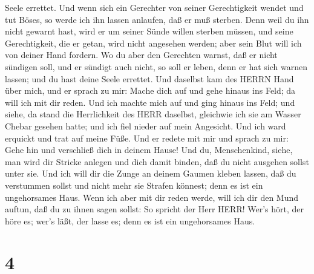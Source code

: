 Seele errettet.  Und wenn sich ein Gerechter von seiner
Gerechtigkeit wendet und tut Böses, so werde ich ihn lassen anlaufen,
daß er muß sterben. Denn weil du ihn nicht gewarnt hast, wird er um
seiner Sünde willen sterben müssen, und seine Gerechtigkeit, die er
getan, wird nicht angesehen werden; aber sein Blut will ich von deiner
Hand fordern.  Wo du aber den Gerechten warnst, daß er
nicht sündigen soll, und er sündigt auch nicht, so soll er leben, denn
er hat sich warnen lassen; und du hast deine Seele errettet.
 Und daselbst kam des HERRN Hand über mich, und er sprach
zu mir: Mache dich auf und gehe hinaus ins Feld; da will ich mit dir
reden.  Und ich machte mich auf und ging hinaus ins Feld;
und siehe, da stand die Herrlichkeit des HERR daselbst, gleichwie ich
sie am Wasser Chebar gesehen hatte; und ich fiel nieder auf mein
Angesicht.  Und ich ward erquickt und trat auf meine Füße.
Und er redete mit mir und sprach zu mir: Gehe hin und verschließ dich in
deinem Hause!  Und du, Menschenkind, siehe, man wird dir
Stricke anlegen und dich damit binden, daß du nicht ausgehen sollst
unter sie.  Und ich will dir die Zunge an deinem Gaumen
kleben lassen, daß du verstummen sollst und nicht mehr sie Strafen
könnest; denn es ist ein ungehorsames Haus.  Wenn ich aber
mit dir reden werde, will ich dir den Mund auftun, daß du zu ihnen sagen
sollst: So spricht der Herr HERR! Wer's hört, der höre es; wer's läßt,
der lasse es; denn es ist ein ungehorsames Haus.

\hypertarget{section-3}{%
\section{4}\label{section-3}}

